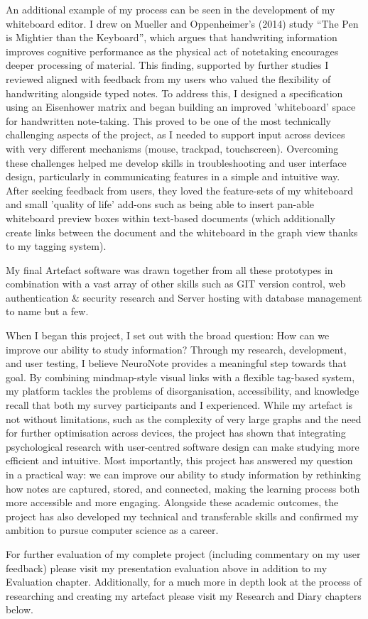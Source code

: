 An additional example of my process can be seen in the development of my whiteboard editor. I drew on Mueller and Oppenheimer's (2014) study “The Pen is Mightier than the Keyboard”, which argues that handwriting information improves cognitive performance as the physical act of notetaking encourages deeper processing of material. This finding, supported by further studies I reviewed aligned with feedback from my users who valued the flexibility of handwriting alongside typed notes.
To address this, I designed a specification using an Eisenhower matrix and began building an improved 'whiteboard' space for handwritten note-taking. This proved to be one of the most technically challenging aspects of the project, as I needed to support input across devices with very different mechanisms (mouse, trackpad, touchscreen). Overcoming these challenges helped me develop skills in troubleshooting and user interface design, particularly in communicating features in a simple and intuitive way.
After seeking feedback from users, they loved the feature-sets of my whiteboard and small 'quality of life' add-ons such as being able to insert pan-able whiteboard preview boxes within text-based documents (which additionally create links between the document and the whiteboard in the graph view thanks to my tagging system).

My final Artefact software was drawn together from all these prototypes in combination with a vast array of other skills such as GIT version control, web authentication \& security research and Server hosting with database management to name but a few. 

When I began this project, I set out with the broad question: How can we improve our ability to study information? Through my research, development, and user testing, I believe NeuroNote provides a meaningful step towards that goal. By combining mindmap-style visual links with a flexible tag-based system, my platform tackles the problems of disorganisation, accessibility, and knowledge recall that both my survey participants and I experienced. While my artefact is not without limitations, such as the complexity of very large graphs and the need for further optimisation across devices, the project has shown that integrating psychological research with user-centred software design can make studying more efficient and intuitive. Most importantly, this project has answered my question in a practical way: we can improve our ability to study information by rethinking how notes are captured, stored, and connected, making the learning process both more accessible and more engaging. Alongside these academic outcomes, the project has also developed my technical and transferable skills and confirmed my ambition to pursue computer science as a career.

For further evaluation of my complete project (including commentary on my user feedback) please visit my presentation evaluation above in addition to my Evaluation chapter. Additionally, for a much more in depth look at the process of researching and creating my artefact please visit my Research and Diary chapters below.
